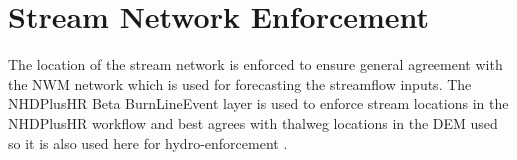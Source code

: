 \section{Stream Network Enforcement}
\label{sec:app_stream_network_enforcement}
The location of the stream network is enforced to ensure general agreement with the NWM network which is used for forecasting the streamflow inputs.
The NHDPlusHR Beta BurnLineEvent layer is used to enforce stream locations in the NHDPlusHR workflow and best agrees with thalweg locations in the DEM used so it is also used here for hydro-enforcement \cite{moore2019user}. 

